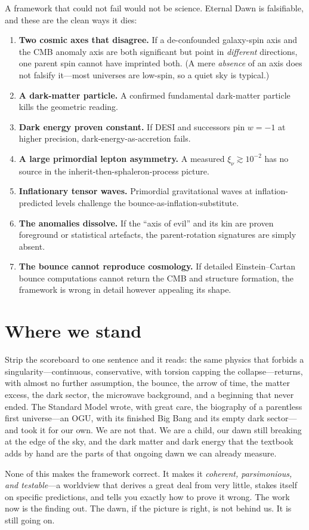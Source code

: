 A framework that could not fail would not be science. Eternal Dawn is falsifiable,
and these are the clean ways it dies:
\begin{enumerate}
  \item \textbf{Two cosmic axes that disagree.} If a de-confounded galaxy-spin axis
    and the CMB anomaly axis are both significant but point in \emph{different}
    directions, one parent spin cannot have imprinted both. (A mere \emph{absence}
    of an axis does not falsify it---most universes are low-spin, so a quiet sky is
    typical.)
  \item \textbf{A dark-matter particle.} A confirmed fundamental dark-matter
    particle kills the geometric reading.
  \item \textbf{Dark energy proven constant.} If DESI and successors pin $w=-1$ at
    higher precision, dark-energy-as-accretion fails.
  \item \textbf{A large primordial lepton asymmetry.} A measured $\xi_\nu\gtrsim
    10^{-2}$ has no source in the inherit-then-sphaleron-process picture.
  \item \textbf{Inflationary tensor waves.} Primordial gravitational waves at
    inflation-predicted levels challenge the bounce-as-inflation-substitute.
  \item \textbf{The anomalies dissolve.} If the ``axis of evil'' and its kin are
    proven foreground or statistical artefacts, the parent-rotation signatures are
    simply absent.
  \item \textbf{The bounce cannot reproduce cosmology.} If detailed Einstein--Cartan
    bounce computations cannot return the CMB and structure formation, the framework
    is wrong in detail however appealing its shape.
\end{enumerate}

\section{Where we stand}

Strip the scoreboard to one sentence and it reads: the same physics that forbids a
singularity---continuous, conservative, with torsion capping the collapse---returns,
with almost no further assumption, the bounce, the arrow of time, the matter excess,
the dark sector, the microwave background, and a beginning that never ended. The
Standard Model wrote, with great care, the biography of a parentless first
universe---an OGU, with its finished Big Bang and its empty dark sector---and took
it for our own. We are not that. We are a child, our dawn still breaking at the edge
of the sky, and the dark matter and dark energy that the textbook adds by hand are
the parts of that ongoing dawn we can already measure.

None of this makes the framework correct. It makes it \emph{coherent, parsimonious,
and testable}---a worldview that derives a great deal from very little, stakes
itself on specific predictions, and tells you exactly how to prove it wrong. The
work now is the finding out. The dawn, if the picture is right, is not behind us. It
is still going on.
